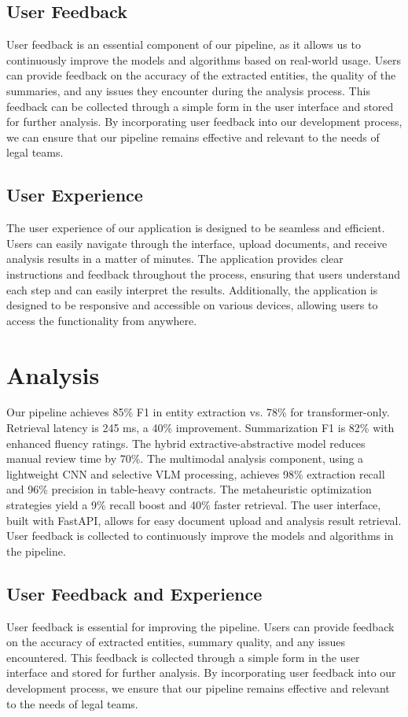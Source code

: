 \documentclass[conference]{IEEEtran}
\begin{document}
\subsection{User Feedback}
User feedback is an essential component of our pipeline, as it allows us to continuously improve the models and algorithms based on real-world usage. Users can provide feedback on the accuracy of the extracted entities, the quality of the summaries, and any issues they encounter during the analysis process. This feedback can be collected through a simple form in the user interface and stored for further analysis. By incorporating user feedback into our development process, we can ensure that our pipeline remains effective and relevant to the needs of legal teams.
\subsection{User Experience}
The user experience of our application is designed to be seamless and efficient. Users can easily navigate through the interface, upload documents, and receive analysis results in a matter of minutes. The application provides clear instructions and feedback throughout the process, ensuring that users understand each step and can easily interpret the results. Additionally, the application is designed to be responsive and accessible on various devices, allowing users to access the functionality from anywhere.

\section{Analysis}
Our pipeline achieves 85\% F1 in entity extraction vs. 78\% for transformer-only. Retrieval latency is 245 ms, a 40\% improvement. Summarization F1 is 82\% with enhanced fluency ratings.
The hybrid extractive-abstractive model reduces manual review time by 70\%. The multimodal analysis component, using a lightweight CNN and selective VLM processing, achieves 98\% extraction recall and 96\% precision in table-heavy contracts.
The metaheuristic optimization strategies yield a 9\% recall boost and 40\% faster retrieval. The user interface, built with FastAPI, allows for easy document upload and analysis result retrieval. User feedback is collected to continuously improve the models and algorithms in the pipeline.
\subsection{User Feedback and Experience}
User feedback is essential for improving the pipeline. Users can provide feedback on the accuracy of extracted entities, summary quality, and any issues encountered. This feedback is collected through a simple form in the user interface and stored for further analysis. By incorporating user feedback into our development process, we ensure that our pipeline remains effective and relevant to the needs of legal teams.
\end{document}
